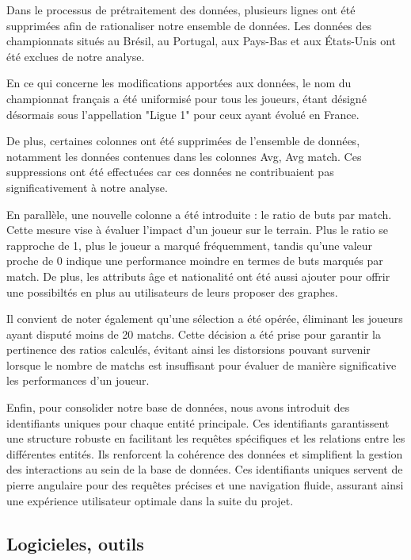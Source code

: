 \documentclass[
]{article}
\begin{document}
\begin{flushleft}
Dans le processus de prétraitement des données, plusieurs lignes ont été supprimées afin de rationaliser notre ensemble de données. Les données des championnats situés au Brésil, au Portugal, aux Pays-Bas et aux États-Unis ont été exclues de notre analyse.

En ce qui concerne les modifications apportées aux données, le nom du championnat français a été uniformisé pour tous les joueurs, étant désigné désormais sous l'appellation "Ligue 1" pour ceux ayant évolué en France.

De plus, certaines colonnes ont été supprimées de l'ensemble de données, notamment les données contenues dans les colonnes Avg, Avg match. Ces suppressions ont été effectuées car ces données ne contribuaient pas significativement à notre analyse.

En parallèle, une nouvelle colonne a été introduite : le ratio de buts par match. Cette mesure vise à évaluer l'impact d'un joueur sur le terrain. Plus le ratio se rapproche de 1, plus le joueur a marqué fréquemment, tandis qu'une valeur proche de 0 indique une performance moindre en termes de buts marqués par match. De plus, les attributs âge et nationalité ont été aussi ajouter pour offrir une possibiltés en plus au utilisateurs de leurs proposer des graphes.

Il convient de noter également qu'une sélection a été opérée, éliminant les joueurs ayant disputé moins de 20 matchs. Cette décision a été prise pour garantir la pertinence des ratios calculés, évitant ainsi les distorsions pouvant survenir lorsque le nombre de matchs est insuffisant pour évaluer de manière significative les performances d'un joueur. 

Enfin, pour consolider notre base de données, nous avons introduit des identifiants uniques pour chaque entité principale. Ces identifiants garantissent une structure robuste en facilitant les requêtes spécifiques et les relations entre les différentes entités. Ils renforcent la cohérence des données et simplifient la gestion des interactions au sein de la base de données. Ces identifiants uniques servent de pierre angulaire pour des requêtes précises et une navigation fluide, assurant ainsi une expérience utilisateur optimale dans la suite du projet.
\end{flushleft}

\hypertarget{logicieles-outils}{%
\subsection{Logicieles, outils}\label{logicieles-outils}}
\end{document}

